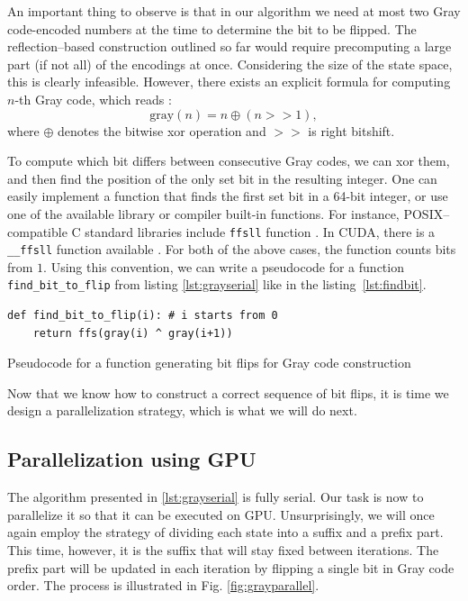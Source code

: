 An important thing to observe is that in our algorithm we need at most two Gray
code-encoded numbers at the time to determine the bit to be flipped. The
reflection--based construction outlined so far would require precomputing a
large part (if not all) of the encodings at once. Considering the size of the
state space, this is clearly infeasible. However, there exists an explicit
formula for computing $n$-th Gray code, which reads \cite{grayalgo}:
\begin{equation}
  \mbox{gray}(n) = n \oplus (n >> 1),
\end{equation}
where $\oplus$ denotes the bitwise xor operation and $>>$ is right bitshift.

To compute which bit differs between consecutive Gray codes, we can xor them,
and then find the position of the only set bit in the resulting integer. One
can easily implement a function that finds the first set bit in a 64-bit
integer, or use one of the available library or compiler built-in functions. For
instance, POSIX--compatible C standard libraries include \texttt{ffsll}
function \cite{ffs}. In CUDA, there is a \texttt{\_\_ffsll} function available \cite{CUDAguide}. For both
of the above cases, the function counts bits from $1$. Using this convention,
we can write a pseudocode for a function \texttt{find\_bit\_to\_flip} from
listing \ref{lst:grayserial} like in the listing~\ref{lst:findbit}.

\begin{listing}
\begin{verbatim}
def find_bit_to_flip(i): # i starts from 0
    return ffs(gray(i) ^ gray(i+1))
\end{verbatim}
\caption{Pseudocode for a function generating bit flips for Gray code construction}
\label{lst:findbit}
\end{listing}

Now that we know how to construct a correct sequence of bit flips, it is time
we design a parallelization strategy, which is what we will do next.

\subsection{Parallelization using GPU}
The algorithm presented in \ref{lst:grayserial} is fully serial. Our task is
now to parallelize it so that it can be executed on GPU. Unsurprisingly, we
will once again employ the strategy of dividing each state into a suffix and a
prefix part. This time, however, it is the suffix that will stay fixed between
iterations. The prefix part will be updated in each iteration by flipping a
single bit in Gray code order. The process is illustrated in Fig.
\ref{fig:grayparallel}.

